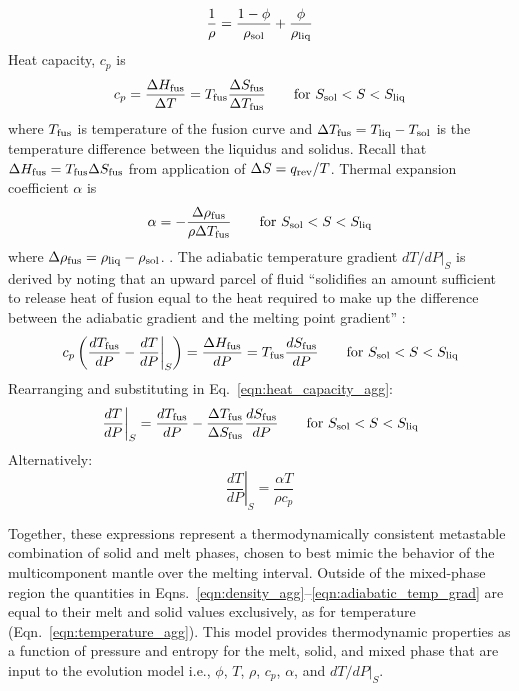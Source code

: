 \begin{equation}
\label{eqn:density_agg}
\dfrac{1}{\rho} = \dfrac{1-\phi}{\rho_{\rm sol}} + \frac{\phi}{\rho_{\rm liq}}%
\end{equation}
Heat capacity, $c_p$ \citep[e.g.,][]{SOLO07,SS293} is
\begin{equation}
\label{eqn:heat_capacity_agg}
c_p = \dfrac{ \Delta H_{\rm fus}}{\Delta T} = T_{\rm fus} \dfrac{\Delta S_{\rm fus}}{\Delta T_{\rm fus}} \quad \quad \text{for } S_{\rm sol}<S<S_{\rm liq}
\end{equation}
where $T_{\rm fus}$ is temperature of the fusion curve and $\Delta T_{\rm fus} = T_{\rm liq}-T_{\rm sol}$ is the temperature difference between the liquidus and solidus.  Recall that $\Delta H _{\rm fus} = T_{\rm fus} \Delta S_{\rm fus}$ from application of $\Delta S = q_{\rm rev}/T$.  Thermal expansion coefficient $\alpha$ \citep[e.g.,][]{SOLO07,SS293} is
\begin{equation}
\label{eqn:thermal_exp_agg}
\alpha = -\dfrac{\Delta \rho_{\rm fus}}{\rho \Delta T_{\rm fus}} \quad \quad \text{for } S_{\rm sol}<S<S_{\rm liq}
\end{equation}
where $\Delta \rho_{\rm fus} = \rho_{\rm liq} - \rho_{\rm sol}$.  . The adiabatic temperature gradient $dT/dP|_S$ is derived by noting that an upward parcel of fluid ``solidifies an amount sufficient to release heat of fusion equal to the heat required to make up the difference between the adiabatic gradient and the melting point gradient'' \citep[quoting from][]{HK71}:
\begin{equation}
\label{eqn:adiabatic_temp_grad_derivation}
\left. c_p \left( \dfrac{dT_{\rm fus}}{dP} - \dfrac{dT}{dP} \right|_S \right) = \dfrac{\Delta H_{\rm fus}}{dP} = T_{\rm fus} \dfrac{d S_{\rm fus}}{dP} \quad \quad \text{for } S_{\rm sol}<S<S_{\rm liq}
\end{equation}
Rearranging and substituting in Eq.~\ref{eqn:heat_capacity_agg}:
\begin{equation}
\label{eqn:adiabatic_temp_grad}
\left. \dfrac{dT}{dP} \right|_S = \dfrac{dT_{\rm fus}}{dP} - \dfrac{\Delta T_{\rm fus}}{\Delta S_{\rm fus}} \dfrac{d S_{\rm fus}}{dP} \quad \quad \text{for } S_{\rm sol}<S<S_{\rm liq}
\end{equation}
Alternatively:
\begin{equation}
\left. \dfrac{dT}{dP} \right|_S = \dfrac{\alpha T}{\rho c_p}
\end{equation}

Together, these expressions represent a thermodynamically consistent metastable combination of solid and melt phases, chosen to best mimic the behavior of the multicomponent mantle over the melting interval.  Outside of the mixed-phase region the quantities in Eqns.~\ref{eqn:density_agg}--\ref{eqn:adiabatic_temp_grad} are equal to their melt and solid values exclusively, as for temperature (Eqn.~\ref{eqn:temperature_agg}).  This model provides thermodynamic properties as a function of pressure and entropy for the melt, solid, and mixed phase that are input to the evolution model i.e., $\phi$, $T$, $\rho$, $c_p$, $\alpha$, and $dT/dP|_S$.
